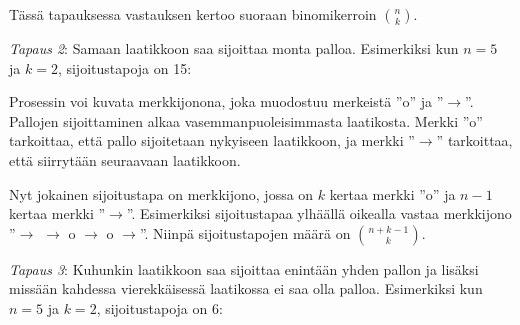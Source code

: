 Tässä tapauksessa vastauksen kertoo suoraan binomikerroin ${n \choose k}$.

\textit{Tapaus 2}: Samaan laatikkoon saa sijoittaa
monta palloa.
Esimerkiksi kun $n=5$ ja $k=2$, sijoitustapoja on 15:

\begin{center}
\end{center}

Prosessin voi kuvata merkkijonona, joka muodostuu
merkeistä ''o'' ja ''$\rightarrow$''.
Pallojen sijoittaminen alkaa
vasemmanpuoleisimmasta laatikosta.
Merkki ''o'' tarkoittaa, että pallo sijoitetaan
nykyiseen laatikkoon, ja merkki
''$\rightarrow$'' tarkoittaa, että siirrytään
seuraavaan laatikkoon.

Nyt jokainen sijoitustapa on merkkijono, jossa
on $k$ kertaa merkki ''o'' ja $n-1$ kertaa
merkki ''$\rightarrow$''.
Esimerkiksi sijoitustapaa
ylhäällä oikealla
vastaa merkkijono ''$\rightarrow$ $\rightarrow$ o $\rightarrow$ o $\rightarrow$''.
Niinpä sijoitustapojen määrä on ${n+k-1 \choose k}$.

\textit{Tapaus 3}: Kuhunkin laatikkoon saa sijoittaa
enintään yhden pallon ja lisäksi missään kahdessa
vierekkäisessä laatikossa ei saa olla palloa.
Esimerkiksi kun $n=5$ ja $k=2$, sijoitustapoja on 6:


